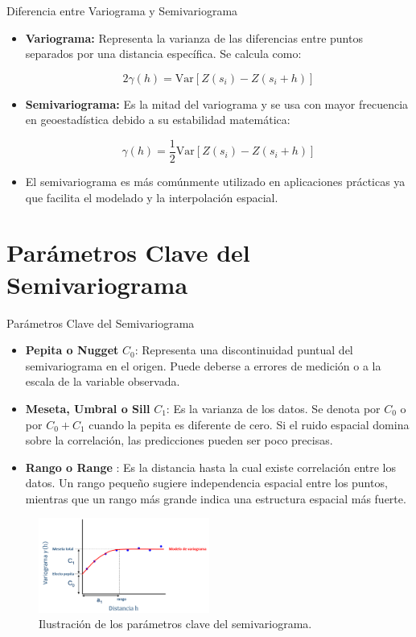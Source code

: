 \documentclass[
  10pt,
  ignorenonframetext,
]{beamer}
\begin{document}
\begin{frame}{Diferencia entre Variograma y Semivariograma}
\begin{itemize}
\item
  \textbf{Variograma:} Representa la varianza de las diferencias entre
  puntos separados por una distancia específica. Se calcula como:

  \begin{equation}
  2\gamma(h) =  \text{Var}[Z(s_i) - Z(s_i + h)]
  \end{equation}
\item
  \textbf{Semivariograma:} Es la mitad del variograma y se usa con mayor
  frecuencia en geoestadística debido a su estabilidad matemática:

  \begin{equation}
  \gamma(h) = \frac{1}{2}   \text{Var}[Z(s_i) - Z(s_i + h)]
  \end{equation}
\item
  El semivariograma es más comúnmente utilizado en aplicaciones
  prácticas ya que facilita el modelado y la interpolación espacial.
\end{itemize}
\end{frame}

\section{Parámetros Clave del
Semivariograma}\label{paruxe1metros-clave-del-semivariograma}

\begin{frame}{Parámetros Clave del Semivariograma}
\begin{itemize} \footnotesize 
   \item \textbf{Pepita o Nugget } $C_0$: Representa una discontinuidad puntual del semivariograma en el origen. Puede deberse a errores de medición o a la escala de la variable observada. 
   \item \textbf{Meseta, Umbral o Sill} $C_1$: Es la varianza de los datos. Se denota por $C_0$  o por $C_0 + C_1$ cuando la pepita es diferente de cero. Si el ruido espacial domina sobre la correlación, las predicciones pueden ser poco precisas.
   \item \textbf{Rango o Range} : Es la distancia hasta la cual existe correlación entre los datos. Un rango pequeño sugiere independencia espacial entre los puntos, mientras que un rango más grande indica una estructura espacial más fuerte. 
\end{itemize}

\begin{figure}
    \centering
    \includegraphics[width=0.5\textwidth]{./imagenes/figura1.png}
    \caption{Ilustración de los parámetros clave del semivariograma.}
\end{figure}
\end{frame}
\end{document}

